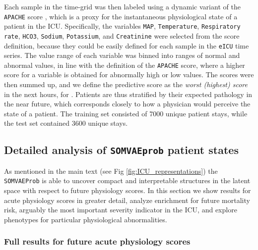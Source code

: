 \documentclass{article}
\begin{document}
Each sample in the time-grid was then labeled using a dynamic variant of the \texttt{APACHE} score \citep{Knaus1985}, which is a proxy for the instantaneous physiological state of a patient in the ICU.
Specifically, the variables \texttt{MAP}, \texttt{Temperature}, \texttt{Respiratory rate}, \texttt{HCO3}, \texttt{Sodium}, \texttt{Potassium}, and \texttt{Creatinine} were selected from the score definition, because they could be easily defined for each sample in the \texttt{eICU} time series.
The value range of each variable was binned into ranges of normal and abnormal values, in line with the definition of the \texttt{APACHE} score, where a higher score for a variable is obtained for abnormally high or low values.
The scores were then summed up, and we define the predictive score as the \emph{worst (highest) score} in the next  hours, for .
Patients are thus stratified by their expected pathology in the near future, which corresponds closely to how a physician would perceive the state of a patient.
The training set consisted of 7000 unique patient stays, while the test set contained 3600 unique stays.


\subsection{Detailed analysis of \texttt{SOMVAEprob} patient states}
\label{subsec:detailed_icu}

As mentioned in the main text (see Fig \ref{fig:ICU_representations}) the \texttt{SOMVAEProb}
is able to uncover compact and interpretable structures in the latent space with respect
to future physiology scores. In this section we show results for acute physiology scores
in greater detail, analyze enrichment for future mortality risk, arguably the most
important severity indicator in the ICU, and explore phenotypes for particular 
physiological abnormalities.



\subsubsection*{Full results for future acute physiology scores}
\end{document}
